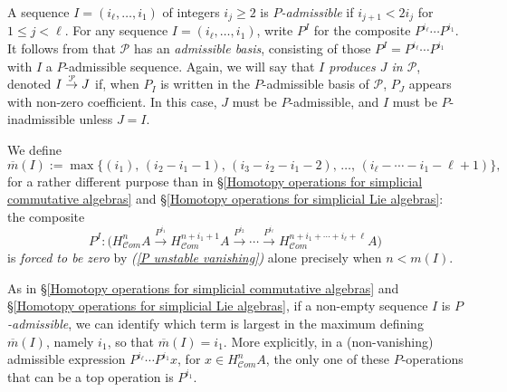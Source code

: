 \documentclass[11pt]{amsart}
\theoremstyle{plain}
\newtheorem{lem}[thm]{Lemma}
\theoremstyle{definition}
\renewcommand{\to}{\longrightarrow}
\newcommand{\scrC}{\mathscr{C}}
\newcommand{\calP}{\mathcal{P}}
\theoremstyle{plain}
\newcommand{\Palg}{{\calP}}
\newcommand{\minDimP}{\overline{m}}
\newcommand{\minDimDelta}{m}
\newcommand{\produces}[3]{#3:#1\sim #2}
\renewcommand{\produces}[3]{#1\rightarrow_{#3} #2}%
\renewcommand{\produces}[3]{#1\overset{\smash{#3}}{\rightarrow} #2}%
\newcommand{\algs}{{\scrC\!\textit{om}}}
\begin{document}
\begin{Constructing (co)homotopy operations}
A sequence $I=(i_\ell,\ldots,i_1)$ of integers $i_j\geq2$ is \emph{$P$-admissible} if $i_{j+1}<2i_j$ for $1\leq j <\ell$. For any sequence $I=(i_\ell,\ldots,i_1)$, write $P^I$ for the composite $P^{i_\ell}\cdots P^{i_1}$. It follows from \cite[Theorem I]{MR1089001} that $\Palg$ has an \emph{admissible basis}, consisting of those $P^I=P^{i_\ell}\cdots P^{i_{1}}$ with $I$ a $P$-admissible sequence.  Again, we will say that \emph{$I$ produces $J$ in $\Palg$}, denoted $\produces{I}{J}{\Palg}$ if, when $P_I$ is written in the $P$-admissible basis of $\Palg$, $P_J$ appears with non-zero coefficient. In this case, $J$ must be $P$-admissible, and $I$ must be $P$-inadmissible unless $J=I$.

We define
\[\minDimP(I):=\max\{(i_1),\,(i_2-i_1-1),\,(i_3-i_2-i_1-2),\,\ldots,\,(i_{\ell}-\cdots-i_1-\ell+1)\},\]
for a rather different purpose than in \S\ref{Homotopy operations for simplicial commutative algebras} and \S\ref{Homotopy operations for simplicial Lie algebras}: the composite 
\[P^I:\bigl(H_{\algs}^{n}A\overset{P^{i_1}}{\to}H_{\algs}^{n+i_1+1}A\overset{P^{i_2}}{\to}\cdots \overset{P^{i_\ell}}{\to}H_{\algs}^{n+i_1+\cdots +i_\ell+\ell}A\bigr)\]
is \emph{forced to be zero} by \emph{(\ref{P unstable vanishing})} alone precisely when $n<\minDimDelta(I)$.

As in \S\ref{Homotopy operations for simplicial commutative algebras} and \S\ref{Homotopy operations for simplicial Lie algebras}, if a non-empty sequence $I$  is \emph{$P$-admissible}, we can identify which term is largest in the maximum defining $\minDimP(I)$, namely $i_1$, so that $\minDimP(I)=i_1$. More explicitly, in a (non-vanishing) admissible expression $P^{i_\ell}\cdots P^{i_1}x$, for $x\in H^n_{\algs}A$, the only one of these $P$-operations that can be a top operation is $P^{i_{1}}$.




\end{Constructing (co)homotopy operations}
\end{document}
